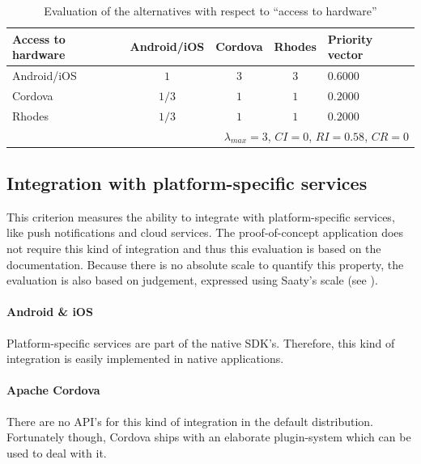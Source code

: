 \begin{table}[h!]
    \centering
    \begin{tabular}{lcccl}
        \hline
        \textbf{Access to hardware} & Android/iOS & Cordova & Rhodes & Priority vector \\
        \hline
        Android/iOS                 & $1$         & $3$     & $3$   & $0.6000$         \\
        Cordova                     & $1/3$       & $1$     & $1$   & $0.2000$         \\
        Rhodes                      & $1/3$       & $1$     & $1$   & $0.2000$         \\
        \hline
        \multicolumn{5}{r}{$\lambda_{max} = 3$, $CI = 0$, $RI = 0.58$, $CR = 0$}       \\
        \hline
    \end{tabular}
    \caption{Evaluation of the alternatives with respect to ``access to hardware''}
    \label{tab:hwaccess}
\end{table}

\subsection{Integration with platform-specific services}

This criterion measures the ability to integrate with platform-specific services, like push notifications and cloud services. The proof-of-concept application does not require this kind of integration and thus this evaluation is based on the documentation. Because there is no absolute scale to quantify this property, the evaluation is also based on judgement, expressed using Saaty's scale (see ).

\paragraph{Android \& iOS} Platform-specific services are part of the native SDK's. Therefore, this kind of integration is easily implemented in native applications.

\paragraph{Apache Cordova} There are no API's for this kind of integration in the default distribution. Fortunately though, Cordova ships with an elaborate plugin-system which can be used to deal with it.

